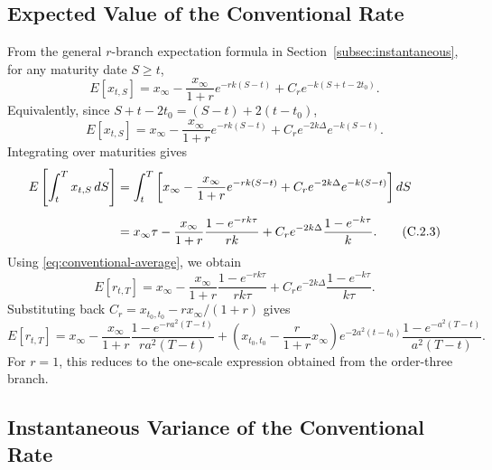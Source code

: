\documentclass[12pt]{article}
\theoremstyle{statementstyle}
\begin{document}
\begin{appendices}
\subsection{Expected Value of the Conventional Rate}
\label{appendix:C1}

From the general $r$-branch expectation formula in
Section~\ref{subsec:instantaneous}, for any maturity date $S\ge t$,
\begin{equation}
E[x_{t,S}]
=
x_{\infty}
-
\frac{x_{\infty}}{1+r}e^{-rk(S-t)}
+
C_{r}e^{-k(S+t-2t_{0})}.
\tag{C.2.1}\label{eq:expected-irfr-general-r-C}
\end{equation}
Equivalently, since $S+t-2t_{0}=(S-t)+2(t-t_{0})$,
\begin{equation}
E[x_{t,S}]
=
x_{\infty}
-
\frac{x_{\infty}}{1+r}e^{-rk(S-t)}
+
C_{r}e^{-2k\Delta}e^{-k(S-t)}.
\tag{C.2.2}\label{eq:expected-irfr-general-r-C-shifted}
\end{equation}
Integrating over maturities gives
\begin{align}
E\left[\int_t^T x_{t,S}\,dS\right]
&=
\int_t^T
\left[
 x_{\infty}
 -\frac{x_{\infty}}{1+r}e^{-rk(S-t)}
 +C_{r}e^{-2k\Delta}e^{-k(S-t)}
\right]dS
\notag\\[0.4em]
&=
x_{\infty}\tau
-
\frac{x_{\infty}}{1+r}
\frac{1-e^{-rk\tau}}{rk}
+
C_{r}e^{-2k\Delta}
\frac{1-e^{-k\tau}}{k}.
\tag{C.2.3}\label{eq:integrated-expected-irfr-general-r}
\end{align}
Using \eqref{eq:conventional-average}, we obtain
\begin{equation}
E[r_{t,T}]
=
x_{\infty}
-
\frac{x_{\infty}}{1+r}
\frac{1-e^{-rk\tau}}{rk\tau}
+
C_{r}e^{-2k\Delta}
\frac{1-e^{-k\tau}}{k\tau}.
\tag{C.2.4}\label{eq:expected-conventional-general-r}
\end{equation}
Substituting back $C_{r}=x_{t_{0},t_{0}}-r x_{\infty}/(1+r)$ gives
\begin{equation}
E[r_{t,T}]
=
x_{\infty}
-
\frac{x_{\infty}}{1+r}
\frac{1-e^{-ra^{2}(T-t)}}{ra^{2}(T-t)}
+
\left(x_{t_{0},t_{0}}-\frac{r}{1+r}x_{\infty}\right)
e^{-2a^{2}(t-t_{0})}
\frac{1-e^{-a^{2}(T-t)}}{a^{2}(T-t)}.
\tag{C.2.5}\label{eq:expected-conventional-general-r-expanded}
\end{equation}
For $r=1$, this reduces to the one-scale expression obtained from the
order-three branch.

\subsection{Instantaneous Variance of the Conventional Rate}
\label{appendix:C2}


\end{appendices}
\end{document}
